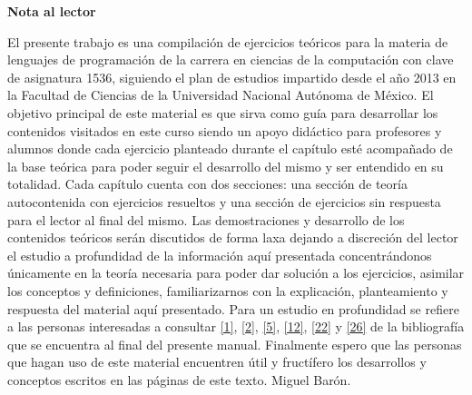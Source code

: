 \begin{center}
	\large
	{\bf Nota al lector}
\end{center}
	El presente trabajo es una compilación de ejercicios teóricos para la materia de lenguajes de programación de la carrera en ciencias de la computación con clave de asignatura 1536, siguiendo el plan de estudios impartido desde el año 2013 en la Facultad de Ciencias de la Universidad Nacional Autónoma de México.\newline\newline
	El objetivo principal de este material es que sirva como guía para desarrollar los contenidos visitados en este curso siendo un apoyo didáctico para profesores y alumnos donde cada ejercicio planteado durante el capítulo esté acompañado de la base teórica para poder seguir el desarrollo del mismo y ser entendido en su totalidad.\newline\newline
	Cada capítulo cuenta con dos secciones: una sección de teoría autocontenida con ejercicios resueltos y una sección de ejercicios sin respuesta para el lector al final del mismo. \newline\newline
	Las demostraciones y desarrollo de los contenidos teóricos serán discutidos de forma laxa dejando a discreción del lector el estudio a profundidad de la información aquí presentada concentrándonos únicamente en la teoría necesaria para poder dar solución a los ejercicios, asimilar los conceptos y definiciones, familiarizarnos con la explicación, planteamiento y respuesta del material aquí presentado. \newline\newline
	Para un estudio en profundidad se refiere a las personas interesadas a consultar  \hyperlink{1}{[1]},   \hyperlink{2}{[2]},   \hyperlink{5}{[5]},   \hyperlink{12}{[12]},  \hyperlink{22}{[22]} y  \hyperlink{26}{[26]} de la bibliografía que se encuentra al final del presente manual.\newline\newline 
	Finalmente espero que las personas que hagan uso de este material encuentren útil y fructífero los desarrollos y conceptos escritos en las páginas de este texto. \newline\newline\newline\newline\newline
	Miguel Barón.

\vspace{50mm}

\newpage
\phantom{~}
\newpage